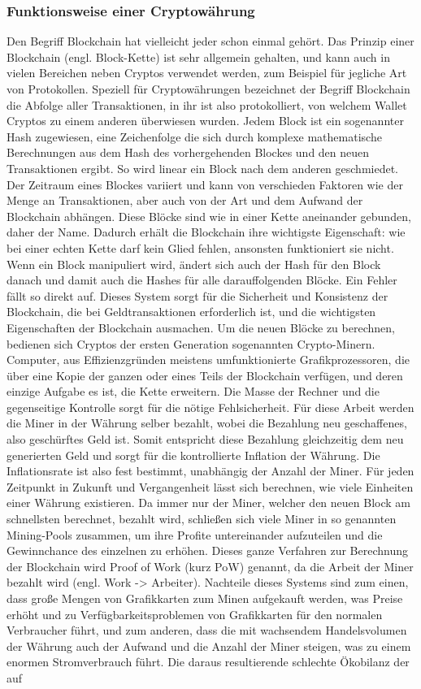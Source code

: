 \documentclass[12pt]{article}
\begin{document}
	\subsubsection{Funktionsweise einer Cryptowährung}
		Den Begriff Blockchain hat vielleicht jeder schon einmal gehört. Das Prinzip einer Blockchain (engl. Block-Kette) ist sehr allgemein gehalten, und kann auch in vielen Bereichen neben Cryptos verwendet werden, zum Beispiel für jegliche Art von Protokollen. Speziell für Cryptowährungen bezeichnet der Begriff Blockchain die Abfolge aller Transaktionen, in ihr ist also protokolliert, von welchem Wallet Cryptos zu einem anderen überwiesen wurden. Jedem Block ist ein sogenannter Hash zugewiesen, eine Zeichenfolge die sich durch komplexe mathematische Berechnungen aus dem Hash des vorhergehenden Blockes und den neuen Transaktionen ergibt. So wird linear ein Block nach dem anderen geschmiedet. Der Zeitraum eines Blockes variiert und kann von verschieden Faktoren wie der Menge an Transaktionen, aber auch von der Art und dem Aufwand der Blockchain abhängen. Diese Blöcke sind wie in einer Kette aneinander gebunden, daher der Name. Dadurch erhält die Blockchain ihre wichtigste Eigenschaft: wie bei einer echten Kette darf kein Glied fehlen, ansonsten funktioniert sie nicht. Wenn ein Block manipuliert wird, ändert sich auch der Hash für den Block danach und damit auch die Hashes für alle darauffolgenden Blöcke. Ein Fehler fällt so direkt auf. Dieses System sorgt für die Sicherheit und Konsistenz der Blockchain, die bei Geldtransaktionen erforderlich ist, und die wichtigsten Eigenschaften der Blockchain ausmachen. Um die neuen Blöcke zu berechnen, bedienen sich Cryptos der ersten Generation sogenannten Crypto-Minern. Computer, aus Effizienzgründen meistens umfunktionierte Grafikprozessoren, die über eine Kopie der ganzen oder eines Teils der Blockchain verfügen, und deren einzige Aufgabe es ist, die Kette erweitern. Die Masse der Rechner und die gegenseitige Kontrolle sorgt für die nötige Fehlsicherheit. Für diese Arbeit werden die Miner in der Währung selber bezahlt, wobei die Bezahlung neu geschaffenes, also \glqq geschürftes\grqq{} Geld ist. Somit entspricht diese Bezahlung gleichzeitig dem neu generierten Geld und sorgt für die kontrollierte Inflation der Währung. Die Inflationsrate ist also fest bestimmt, unabhängig der Anzahl der Miner. Für jeden Zeitpunkt in Zukunft und Vergangenheit lässt sich berechnen, wie viele Einheiten einer Währung existieren. Da immer nur der Miner, welcher den neuen Block am schnellsten berechnet, bezahlt wird, schließen sich viele Miner in so genannten Mining-Pools zusammen, um ihre Profite untereinander aufzuteilen und die Gewinnchance des einzelnen zu erhöhen. Dieses ganze Verfahren zur Berechnung der Blockchain wird \glqq Proof of Work\grqq{} (kurz PoW) genannt, da die Arbeit der Miner bezahlt wird (engl. Work -> Arbeiter). Nachteile dieses Systems sind zum einen, dass große Mengen von Grafikkarten zum Minen aufgekauft werden, was Preise erhöht und zu Verfügbarkeitsproblemen von Grafikkarten für den normalen Verbraucher führt, und zum anderen, dass die mit wachsendem Handelsvolumen der Währung auch der Aufwand und die Anzahl der Miner steigen, was zu einem enormen Stromverbrauch führt. Die daraus resultierende schlechte Ökobilanz der auf 
\end{document}

